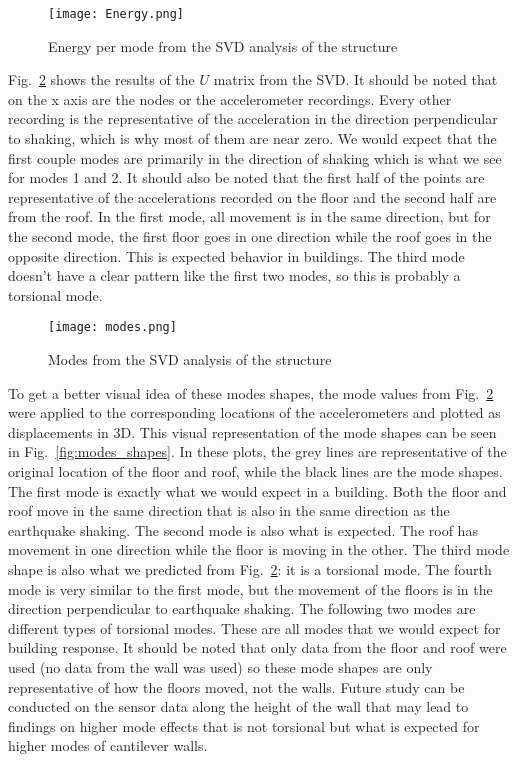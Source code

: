 \documentclass{article}
\begin{document}
\medskip

\begin{figure}
    \centering
    \texttt{[image: Energy.png]}
    \caption{Energy per mode from the SVD analysis of the structure}
    \label{fig:Energy}
\end{figure}

Fig.\  \ref{fig:modes} shows the results of the $U$ matrix from the SVD. It should be noted that on the x axis are the nodes or the accelerometer recordings. Every other recording is the representative of the acceleration in the direction perpendicular to shaking, which is why most of them are near zero. We would expect that the first couple modes are primarily in the direction of shaking which is what we see for modes 1 and 2. It should also be noted that the first half of the points are representative of the accelerations recorded on the floor and the second half are from the roof. In the first mode, all movement is in the same direction, but for the second mode, the first floor goes in one direction while the roof goes in the opposite direction. This is expected behavior in buildings. The third mode doesn't have a clear pattern like the first two modes, so this is probably a torsional mode. 
\medskip

\begin{figure}
    \centering
    \texttt{[image: modes.png]}
    \caption{Modes from the SVD analysis of the structure}
    \label{fig:modes}
\end{figure}
\FloatBarrier

To get a better visual idea of these  modes shapes, the mode values from Fig.\ \ref{fig:modes} were applied to the corresponding locations of the accelerometers and plotted as displacements in 3D. This visual representation of the mode shapes can be seen in Fig.\ \ref{fig:modes_shapes}. In these plots, the grey lines are representative of the original location of the floor and roof, while the black lines are the mode shapes. The first mode is exactly what we would expect in a building. Both the floor and roof move in the same direction that is also in the same direction as the earthquake shaking. The second mode is also what is expected. The roof has movement in one direction while the floor is moving in the other. The third mode shape is also what we predicted from Fig.\ \ref{fig:modes}: it is a torsional mode. The fourth mode is very similar to the first mode, but the movement of the floors is in the direction perpendicular to earthquake shaking. The following two modes are different types of torsional modes. These are all modes that we would expect for building response. It should be noted that only data from the floor and roof were used (no data from the wall was used) so these mode shapes are only representative of how the floors moved, not the walls. Future study can be conducted on the sensor data along the height of the wall that may lead to findings on higher mode effects that is not torsional but what is expected for higher modes of cantilever walls.
\end{document}
